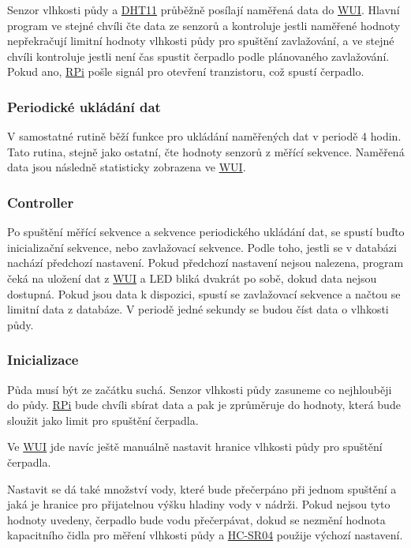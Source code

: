 \documentclass[czech,12pt,a4paper]{article}
\begin{document}
Senzor vlhkosti půdy a \underline{\ac{DHT11}} průběžně posílají naměřená data do \underline{\ac{WUI}}. Hlavní program ve stejné chvíli čte data ze senzorů a kontroluje jestli naměřené hodnoty nepřekračují limitní hodnoty vlhkosti půdy pro spuštění zavlažování, a ve stejné chvíli kontroluje jestli není čas spustit čerpadlo podle plánovaného zavlažování. Pokud ano, \underline{\ac{RPi}} pošle signál pro otevření tranzistoru, což spustí čerpadlo.

\subsubsection{Periodické ukládání dat}

V samostatné rutině běží funkce pro ukládání naměřených dat v periodě 4 hodin. Tato rutina, stejně jako ostatní, čte hodnoty senzorů z měřící sekvence. Naměřená data jsou následně statisticky zobrazena ve \underline{\ac{WUI}}.

\subsubsection{Controller}

Po spuštění měřící sekvence a sekvence periodického ukládání dat, se spustí buďto inicializační sekvence, nebo zavlažovací sekvence. Podle toho, jestli se v databázi nachází předchozí nastavení. Pokud předchozí nastavení nejsou nalezena, program čeká na uložení dat z \space \underline{\ac{WUI}} a \ac{LED} bliká dvakrát po sobě, dokud data nejsou dostupná. Pokud jsou data k dispozici, spustí se zavlažovací sekvence a načtou se limitní data z databáze. V periodě jedné sekundy se budou číst data o vlhkosti půdy.

\subsubsection{Inicializace}

Půda musí být ze začátku suchá. Senzor vlhkosti půdy zasuneme co nejhlouběji do půdy. \underline{\ac{RPi}} bude chvíli sbírat data a pak je zprůměruje do hodnoty, která bude sloužit jako limit pro spuštění čerpadla.

Ve \underline{\ac{WUI}} jde navíc ještě manuálně nastavit hranice vlhkosti půdy pro spuštění čerpadla.

Nastavit se dá také množství vody, které bude přečerpáno při jednom spuštění a jaká je hranice pro přijatelnou výšku hladiny vody v nádrži. Pokud nejsou tyto hodnoty uvedeny, čerpadlo bude vodu přečerpávat, dokud se nezmění hodnota kapacitního čidla pro měření vlhkosti půdy a \space \underline{\ac{HC-SR04}} použije výchozí nastavení.
\end{document}
